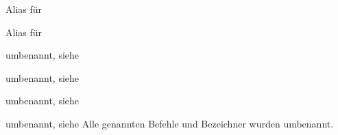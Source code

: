 \begin{Declaration}{}{%
  Alias für %
}
\begin{Declaration}{}{%
  Alias für %
}
\begin{Declaration}{}{umbenannt, siehe }
\begin{Declaration}{}{umbenannt, siehe }
\begin{Declaration}{}{umbenannt, siehe }
\begin{Declaration}{}{%
  umbenannt, siehe %
}
\printdeclarationlist*%
%
Alle genannten Befehle und Bezeichner wurden umbenannt.
\end{Declaration}
\end{Declaration}

\end{Declaration}
\end{Declaration}
\end{Declaration}
\end{Declaration}
